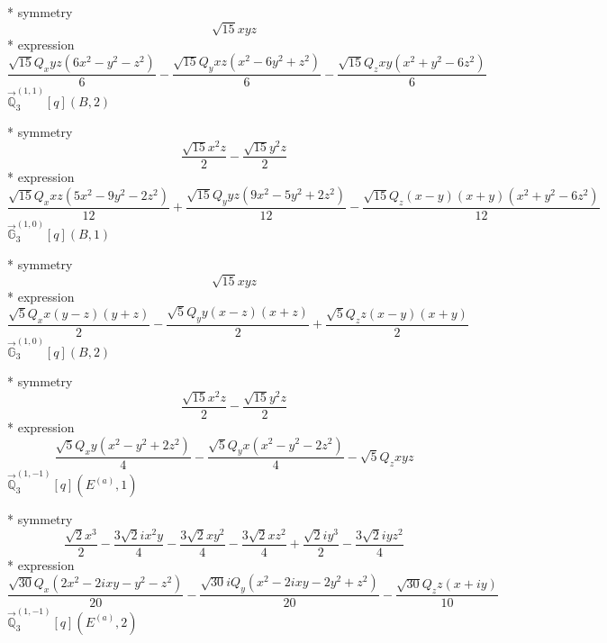 \documentclass[fleqn,8pt]{jsarticle}
\begin{document}
\noindent\quad ** symmetry
\begin{dmath*}
\sqrt{15} x y z
\end{dmath*}
\noindent\quad ** expression
\begin{dmath*}
\frac{\sqrt{15} Q_{x} y z \left(6 x^{2} - y^{2} - z^{2}\right)}{6} - \frac{\sqrt{15} Q_{y} x z \left(x^{2} - 6 y^{2} + z^{2}\right)}{6} - \frac{\sqrt{15} Q_{z} x y \left(x^{2} + y^{2} - 6 z^{2}\right)}{6}
\end{dmath*}
\noindent\quad $\vec{\mathbb{Q}}_{3}^{(1,1)}[q](B,2)$

\noindent\quad ** symmetry
\begin{dmath*}
\frac{\sqrt{15} x^{2} z}{2} - \frac{\sqrt{15} y^{2} z}{2}
\end{dmath*}
\noindent\quad ** expression
\begin{dmath*}
\frac{\sqrt{15} Q_{x} x z \left(5 x^{2} - 9 y^{2} - 2 z^{2}\right)}{12} + \frac{\sqrt{15} Q_{y} y z \left(9 x^{2} - 5 y^{2} + 2 z^{2}\right)}{12} - \frac{\sqrt{15} Q_{z} \left(x - y\right) \left(x + y\right) \left(x^{2} + y^{2} - 6 z^{2}\right)}{12}
\end{dmath*}
\noindent\quad $\vec{\mathbb{G}}_{3}^{(1,0)}[q](B,1)$

\noindent\quad ** symmetry
\begin{dmath*}
\sqrt{15} x y z
\end{dmath*}
\noindent\quad ** expression
\begin{dmath*}
\frac{\sqrt{5} Q_{x} x \left(y - z\right) \left(y + z\right)}{2} - \frac{\sqrt{5} Q_{y} y \left(x - z\right) \left(x + z\right)}{2} + \frac{\sqrt{5} Q_{z} z \left(x - y\right) \left(x + y\right)}{2}
\end{dmath*}
\noindent\quad $\vec{\mathbb{G}}_{3}^{(1,0)}[q](B,2)$

\noindent\quad ** symmetry
\begin{dmath*}
\frac{\sqrt{15} x^{2} z}{2} - \frac{\sqrt{15} y^{2} z}{2}
\end{dmath*}
\noindent\quad ** expression
\begin{dmath*}
\frac{\sqrt{5} Q_{x} y \left(x^{2} - y^{2} + 2 z^{2}\right)}{4} - \frac{\sqrt{5} Q_{y} x \left(x^{2} - y^{2} - 2 z^{2}\right)}{4} - \sqrt{5} Q_{z} x y z
\end{dmath*}
\noindent\quad $\vec{\mathbb{Q}}_{3}^{(1,-1)}[q](E^{(a)},1)$

\noindent\quad ** symmetry
\begin{dmath*}
\frac{\sqrt{2} x^{3}}{2} - \frac{3 \sqrt{2} i x^{2} y}{4} - \frac{3 \sqrt{2} x y^{2}}{4} - \frac{3 \sqrt{2} x z^{2}}{4} + \frac{\sqrt{2} i y^{3}}{2} - \frac{3 \sqrt{2} i y z^{2}}{4}
\end{dmath*}
\noindent\quad ** expression
\begin{dmath*}
\frac{\sqrt{30} Q_{x} \left(2 x^{2} - 2 i x y - y^{2} - z^{2}\right)}{20} - \frac{\sqrt{30} i Q_{y} \left(x^{2} - 2 i x y - 2 y^{2} + z^{2}\right)}{20} - \frac{\sqrt{30} Q_{z} z \left(x + i y\right)}{10}
\end{dmath*}
\noindent\quad $\vec{\mathbb{Q}}_{3}^{(1,-1)}[q](E^{(a)},2)$
\end{document}
